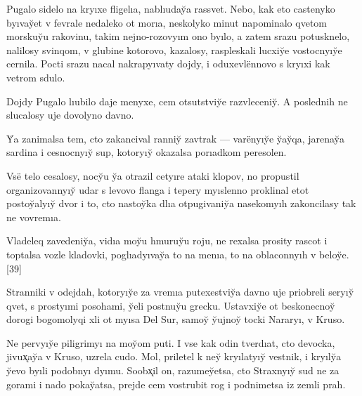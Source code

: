 \documentclass[10pt]{book}
\begin{document}
\newcommand{\e}{ë}

\renewcommand{\i}{ı}

\newcommand{\yi}{yı}

\newcommand{\ia}{ıa}

\newcommand{\iu}{ıu}

\newcommand{\y}{y̆}

\newcommand{\Y}{Y̆}


Pugalo sidelo na kr{\yi}xe fligel{\ia}, nabl{\iu}da{\y}a rassvet. Nebo, kak eto castenyko b{\yi}va{\y}et v fevrale nedaleko ot mor{\ia}, neskolyko minut napominalo qvetom morsku{\y}u rakovinu, takim nejno-rozov{\yi}m ono b{\yi}lo, a zatem srazu potusknelo, nalilosy svinqom, v glubine kotorovo, kazalosy, raspleskali lucxi{\y}e vostocn{\yi}{\y}e cernila. Pocti srazu nacal nakrap{\yi}vaty dojdy, i oduxevl{\e}nnovo s kr{\yi}xi kak vetrom sdulo.

Dojdy Pugalo l{\iu}bilo daje menyxe, cem otsutstvi{\y}e razvleceni{\y}. A poslednih ne slucalosy uje dovolyno davno.

{\Y}a zanimalsa tem, cto zakancival ranni{\y} zavtrak — var{\e}n{\yi}{\y}e {\y}a{\y}qa, jarena{\y}a sardina i cesnocn{\yi}{\y} sup, kotor{\yi}{\y} okazalsa por{\ia}dkom peresolen.

Vs{\e} telo cesalosy, noc{\y}u {\y}a otrazil cet{\yi}re ataki klopov, no propustil organizovann{\yi}{\y} udar s levovo flanga i tepery m{\yi}slenno proklinal etot posto{\y}al{\yi}{\y} dvor i to, cto nasto{\y}ka dl{\ia} otpugivani{\y}a nasekom{\yi}h zakoncilasy tak ne vovrem{\ia}.

Vladeleq zavedeni{\y}a, vid{\ia} mo{\y}u hmuru{\y}u roju, ne rexalsa prosity rascot i toptalsa vozle kladovki, pogl{\ia}d{\yi}va{\y}a to na men{\ia}, to na oblaconn{\yi}h v belo{\y}e.[39]

Stranniki v odejdah, kotor{\yi}{\y}e za vrem{\ia} putexestvi{\y}a davno uje priobreli ser{\yi}{\y} qvet, s prost{\yi}mi posohami, {\y}eli postnu{\y}u grecku. Ustavxi{\y}e ot beskonecno{\y} dorogi bogomolyqi xli ot m{\yi}sa Del Sur, samo{\y} {\y}ujno{\y} tocki Narar{\yi}, v Kruso.

Ne perv{\yi}{\y}e piligrim{\yi} na mo{\y}om puti. I vse kak odin tverd{\ia}t, cto devocka, jivux̨a{\y}a v Kruso, uzrela cudo. Mol, priletel k ne{\y} kr{\yi}lat{\yi}{\y} vestnik, i kr{\yi}l{\y}a {\y}evo b{\yi}li podobn{\yi} d{\yi}mu. Soobx̨il on, razume{\y}etsa, cto Straxn{\yi}{\y} sud ne za gorami i nado poka{\y}atsa, prejde cem vostrubit rog i podnimetsa iz zemli prah.
\end{document}
